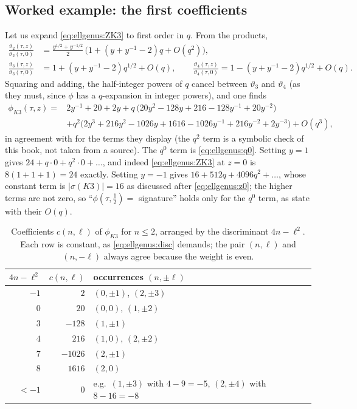 \subsection{Worked example: the first coefficients}\label{sec:ellgenus:worked1}

Let us expand \eqref{eq:ellgenus:ZK3} to first order in $q$. From the products,
\begin{align*}
 \frac{\vartheta_2(\tau,z)}{\vartheta_2(\tau,0)}
   &=\frac{y^{1/2}+y^{-1/2}}{2}\,\big(1+(y+y^{-1}-2)q+O(q^2)\big),\\
 \frac{\vartheta_3(\tau,z)}{\vartheta_3(\tau,0)}
   &=1+(y+y^{-1}-2)q^{1/2}+O(q),\qquad
 \frac{\vartheta_4(\tau,z)}{\vartheta_4(\tau,0)}
   =1-(y+y^{-1}-2)q^{1/2}+O(q).
\end{align*}
Squaring and adding, the half-integer powers of $q$ cancel between $\vartheta_3$ and
$\vartheta_4$ (as they must, since $\phi$ has a $q$-expansion in integer powers), and one
finds
\begin{equation}\label{eq:ellgenus:expansion}
\begin{split}
 \phi_{K3}(\tau,z)={}&2y^{-1}+20+2y+q\,\big(20y^{2}-128y+216-128y^{-1}+20y^{-2}\big)\\
 &+q^2\big(2y^{3}+216y^{2}-1026y+1616-1026y^{-1}+216y^{-2}+2y^{-3}\big)+O(q^3),
\end{split}
\end{equation}
in agreement with  for the terms they display (the
$q^2$ term is a symbolic check of this book, not taken from a source). The $q^0$ term is
\eqref{eq:ellgenus:q0}. Setting $y=1$ gives $24+q\cdot0+q^2\cdot0+\dots$, and indeed
\eqref{eq:ellgenus:ZK3} at $z=0$ is $8(1+1+1)=24$ exactly. Setting $y=-1$ gives
$16+512q+4096q^2+\dots$, whose constant term is $|\sigma(K3)|=16$ as discussed after
\eqref{eq:ellgenus:z0}; the higher terms are not zero, so ``$\phi(\tau,\tfrac12)=$
signature'' holds only for the $q^0$ term, as  state with their $O(q)$.

\begin{table}[htbp]
\centering
\caption{Coefficients $c(n,\ell)$ of $\phi_{K3}$ for $n\le2$, arranged by the discriminant
$4n-\ell^2$. Each row is constant, as \eqref{eq:ellgenus:disc} demands; the pair $(n,\ell)$
and $(n,-\ell)$ always agree because the weight is even.}
\label{tab:ellgenus:coeffs}
\begin{tabular}{@{}rrl@{}}
\toprule
$4n-\ell^2$ & $c(n,\ell)$ & occurrences $(n,\pm\ell)$ \\
\midrule
$-1$ & $2$    & $(0,\pm1)$, $(2,\pm3)$ \\
$0$  & $20$   & $(0,0)$, $(1,\pm2)$ \\
$3$  & $-128$ & $(1,\pm1)$ \\
$4$  & $216$  & $(1,0)$, $(2,\pm2)$ \\
$7$  & $-1026$& $(2,\pm1)$ \\
$8$  & $1616$ & $(2,0)$ \\
\midrule
$<-1$ & $0$ & e.g.\ $(1,\pm3)$ with $4-9=-5$, $(2,\pm4)$ with $8-16=-8$ \\
\bottomrule
\end{tabular}
\end{table}

